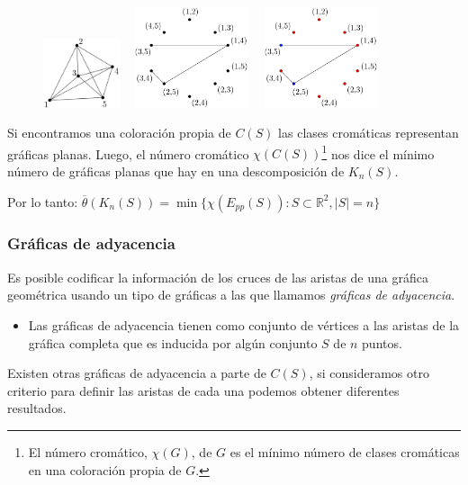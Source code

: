 \begin{frame}
\begin{figure}
	\centering
	\includegraphics[width=0.2\textwidth]{images/K5}%
	~\vrule
	\includegraphics[width=0.3\textwidth]{images/EppK5}
	~\vrule
	\includegraphics[width=0.3\textwidth]{images/EppK5_colored}
\end{figure}
Si encontramos una coloración propia de $C(S)$ las clases cromáticas representan gráficas planas. Luego, el número cromático $\chi(C(S))$\let\thefootnote\relax\footnote{El número cromático, $\chi(G)$, de $G$ es el mínimo número de clases cromáticas en una coloración propia de $G$.} nos dice el mínimo número de gráficas planas que hay en una descomposición de $K_n(S)$.

Por lo tanto: $\overline{\theta}(K_n(S)) = \min\{\chi(E_{pp}(S)) : S \subset \mathbb{R}^2, |S| = n\}$
\end{frame}

\begin{frame}\frametitle{Gráficas de adyacencia}
Es posible codificar la información de los cruces de las aristas de una gráfica geométrica usando un tipo de gráficas a las que llamamos \emph{gráficas de adyacencia}.

\begin{itemize}
	\item Las gráficas de adyacencia tienen como conjunto de vértices a las aristas de la gráfica completa que es inducida por algún conjunto $S$ de $n$ puntos.
\end{itemize}

	Existen otras gráficas de adyacencia a parte de $C(S)$, si consideramos otro criterio para definir las aristas de cada una podemos obtener diferentes resultados.
\end{frame}

